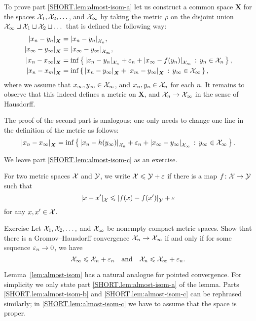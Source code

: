 To prove part \ref{SHORT.lem:almost-isom-a} let us construct a common space $\bm{X}$ for the spaces $\mathcal{X}_1,\mathcal{X}_2,\dots$, and $\mathcal{X}_\infty$
by taking the metric $\rho$ on the disjoint union $\mathcal{X}_\infty\sqcup\mathcal{X}_1\sqcup\mathcal{X}_2\sqcup\dots$ that is defined the following way:
\begin{align*}
|{x_n}-{y_n}|_{\bm{X}}^{{}}&=|{x_n}-{y_n}|_{\mathcal{X}_n}^{{}},
\\
|{x_\infty}-{y_\infty}|_{\bm{X}}^{{}}&=|{x_\infty}-{y_\infty}|_{\mathcal{X}_\infty}^{{}},
\\
|{x_n}-{x_\infty}|_{\bm{X}}^{{}}&=\inf\left\{\,{|{x_n}-{y_n}|_{\mathcal{X}_n}^{{}}+\varepsilon_n+|{x_\infty}-{f(y_n)}|_{\mathcal{X}_\infty}^{{}}}\,:\,{{y_n}\in \mathcal{X}_n}\,\right\},
\\
|{x_n}-{x_m}|_{\bm{X}}^{{}}&=\inf\left\{\,{|{x_n}-{y_\infty}|_{\bm{X}}^{{}}+|{x_m}-{y_\infty}|_{\bm{X}}^{{}}}\,:\,{y_\infty\in\mathcal{X}_\infty}\,\right\},
\end{align*}
where we assume that $x_\infty,y_\infty\in \mathcal{X}_\infty$, and $x_n,y_n\in \mathcal{X}_n$ for each $n$. 
It remains to observe that this indeed defines a metric on $\bm{X}$, and $\mathcal{X}_n\to \mathcal{X}_\infty$ in the sense of Hausdorff.

The proof of the second part is analogous; one only needs to change one line in the definition of the metric as follows:
\[|{x_n}-{x_\infty}|_{\bm{X}}^{{}}=\inf\left\{\,{|{x_n}-{h(y_\infty)}|_{\mathcal{X}_n}^{{}}+\varepsilon_n+|{x_\infty}-{y_\infty}|_{\mathcal{X}_\infty}^{{}}}\,:\,{{y_\infty}\in \mathcal{X}_\infty}\,\right\}.\]

We leave part \ref{SHORT.lem:almost-isom-c} as an exercise.
\qedsf

For two metric spaces $\mathcal{X}$ and $\mathcal{Y}$,
we write $\mathcal{X}\leqslant \mathcal{Y}+\varepsilon$ if
there is a map $f\colon\mathcal{X}\to \mathcal{Y}$ such that
\[|{x}-{x'}|_{\mathcal{X}}^{{}}\leqslant |{f(x)}-{f(x')}|_{\mathcal{Y}}^{{}}+\varepsilon\]
for any $x,x'\in \mathcal{X}$.

\begin{thm}{Exercise}\label{ex:GH-po}
Let $\mathcal{X}_1,\mathcal{X}_2,\dots,$ and $\mathcal{X}_\infty$ be nonempty compact metric spaces.
Show that there is a Gromov--Hausdorff convergence $\mathcal{X}_n\to\mathcal{X}_\infty$ if and only if for some sequence $\varepsilon_n\to 0$,
we have
\[\mathcal{X}_\infty\leqslant \mathcal{X}_n+\varepsilon_n\quad\text{and}\quad \mathcal{X}_n\leqslant \mathcal{X}_\infty+\varepsilon_n.\]
\end{thm}

Lemma~\ref{lem:almost-isom} has a natural analogue for pointed convergence.
For simplicity we only state part \ref{SHORT.lem:almost-isom-a} of the lemma.
Parts \ref{SHORT.lem:almost-isom-b} and \ref{SHORT.lem:almost-isom-c} can be rephrased similarly;
in \ref{SHORT.lem:almost-isom-c} we have to assume that the space is proper.

